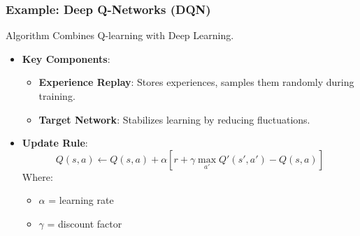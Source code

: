 \documentclass[aspectratio=169]{beamer}
\begin{document}
\begin{frame}[fragile]
    \frametitle{Example: Deep Q-Networks (DQN)}
    \begin{block}{Algorithm}
        Combines Q-learning with Deep Learning.
    \end{block}
    \begin{itemize}
        \item \textbf{Key Components}:
            \begin{itemize}
                \item \textbf{Experience Replay}: Stores experiences, samples them randomly during training.
                \item \textbf{Target Network}: Stabilizes learning by reducing fluctuations.
            \end{itemize}
        \item \textbf{Update Rule}:
            \begin{equation}
                Q(s, a) \leftarrow Q(s, a) + \alpha \left[ r + \gamma \max_{a'} Q'(s', a') - Q(s, a) \right]
            \end{equation}
            Where:
            \begin{itemize}
                \item $\alpha$ = learning rate
                \item $\gamma$ = discount factor
            \end{itemize}
    \end{itemize}
\end{frame}
\end{document}

